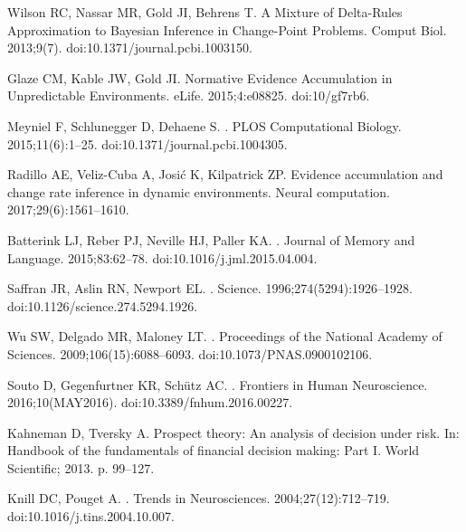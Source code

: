 \documentclass[10pt,letterpaper]{article}
\begin{document}
\begin{thebibliography}{10}
Wilson RC, Nassar MR, Gold JI, Behrens T.
\newblock A Mixture of Delta-Rules Approximation to Bayesian Inference in
  Change-Point Problems.
 Comput Biol. 2013;9(7).
\newblock doi:{10.1371/journal.pcbi.1003150}.

Glaze CM, Kable JW, Gold JI.
\newblock Normative Evidence Accumulation in Unpredictable Environments.
\newblock eLife. 2015;4:e08825.
\newblock doi:{10/gf7rb6}.

Meyniel F, Schlunegger D, Dehaene S.
.
\newblock PLOS Computational Biology. 2015;11(6):1--25.
\newblock doi:{10.1371/journal.pcbi.1004305}.

Radillo AE, Veliz-Cuba A, Josi{\'c} K, Kilpatrick ZP.
\newblock Evidence accumulation and change rate inference in dynamic
  environments.
\newblock Neural computation. 2017;29(6):1561--1610.

Batterink LJ, Reber PJ, Neville HJ, Paller KA.
.
\newblock Journal of Memory and Language. 2015;83:62--78.
\newblock doi:{10.1016/j.jml.2015.04.004}.

Saffran JR, Aslin RN, Newport EL.
.
\newblock Science. 1996;274(5294):1926--1928.
\newblock doi:{10.1126/science.274.5294.1926}.

Wu SW, Delgado MR, Maloney LT.
.
\newblock Proceedings of the National Academy of Sciences.
  2009;106(15):6088--6093.
\newblock doi:{10.1073/PNAS.0900102106}.

Souto D, Gegenfurtner KR, Sch{\"{u}}tz AC.
.
\newblock Frontiers in Human Neuroscience. 2016;10(MAY2016).
\newblock doi:{10.3389/fnhum.2016.00227}.

Kahneman D, Tversky A.
\newblock Prospect theory: An analysis of decision under risk.
\newblock In: Handbook of the fundamentals of financial decision making: Part
  I. World Scientific; 2013. p. 99--127.

Knill DC, Pouget A.
.
\newblock Trends in Neurosciences. 2004;27(12):712--719.
\newblock doi:{10.1016/j.tins.2004.10.007}.


\end{thebibliography}
\end{document}
